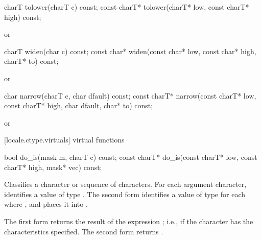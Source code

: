 %
\begin{itemdecl}
charT        tolower(charT c) const;
const charT* tolower(charT* low, const charT* high) const;
\end{itemdecl}

\begin{itemdescr}
\pnum
\returns
{}
or
\end{itemdescr}

%
\begin{itemdecl}
charT       widen(char c) const;
const char* widen(const char* low, const char* high, charT* to) const;
\end{itemdecl}

\begin{itemdescr}
\pnum
\returns
{}
or
\end{itemdescr}

%
\begin{itemdecl}
char         narrow(charT c, char dfault) const;
const charT* narrow(const charT* low, const charT* high, char dfault,
                    char* to) const;
\end{itemdecl}

\begin{itemdescr}
\pnum
\returns
{}
or
\end{itemdescr}

[locale.ctype.virtuals]{ virtual functions}

%
\begin{itemdecl}
bool         do_is(mask m, charT c) const;
const charT* do_is(const charT* low, const charT* high,
                   mask* vec) const;
\end{itemdecl}

\begin{itemdescr}
\pnum
\effects
Classifies a character or sequence of characters.
For each argument character, identifies a value
of type
.
The second form identifies a value  of type
for each
where
,
and places it into
.

\pnum
\returns
The first form returns the result of the expression
;
i.e.,
if the character has the characteristics specified.
The second form returns .
\end{itemdescr}

